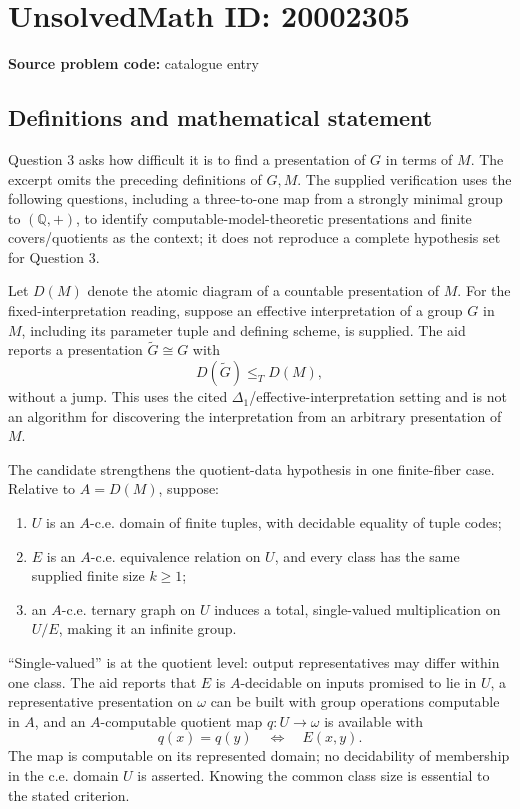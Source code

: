 \documentclass[11pt]{article}
\newcommand{\Q}{\mathbb{Q}}
\begin{document}
\section*{UnsolvedMath ID: 20002305}
\textbf{Source problem code:} catalogue entry
\subsection{Definitions and mathematical statement}
Question 3 asks how difficult it is to find a presentation of \(G\) in terms of \(M\). The excerpt omits the preceding definitions of \(G,M\). The supplied verification uses the following questions, including a three-to-one map from a strongly minimal group to \((\Q,+)\), to identify computable-model-theoretic presentations and finite covers/quotients as the context; it does not reproduce a complete hypothesis set for Question 3.

Let \(D(M)\) denote the atomic diagram of a countable presentation of \(M\). For the fixed-interpretation reading, suppose an effective interpretation of a group \(G\) in \(M\), including its parameter tuple and defining scheme, is supplied. The aid reports a presentation \(\widetilde G\cong G\) with
\[
 D(\widetilde G)\le_T D(M),
\]
without a jump. This uses the cited \(\Delta_1\)/effective-interpretation setting and is not an algorithm for discovering the interpretation from an arbitrary presentation of \(M\).

The candidate strengthens the quotient-data hypothesis in one finite-fiber case. Relative to \(A=D(M)\), suppose:
\begin{enumerate}
\item \(U\) is an \(A\)-c.e. domain of finite tuples, with decidable equality of tuple codes;
\item \(E\) is an \(A\)-c.e. equivalence relation on \(U\), and every class has the same supplied finite size \(k\ge1\);
\item an \(A\)-c.e. ternary graph on \(U\) induces a total, single-valued multiplication on \(U/E\), making it an infinite group.
\end{enumerate}
``Single-valued'' is at the quotient level: output representatives may differ within one class. The aid reports that \(E\) is \(A\)-decidable on inputs promised to lie in \(U\), a representative presentation on \(\omega\) can be built with group operations computable in \(A\), and an \(A\)-computable quotient map \(q:U\to\omega\) is available with
\[
 q(x)=q(y)\quad\Longleftrightarrow\quad E(x,y).
\]
The map is computable on its represented domain; no decidability of membership in the c.e. domain \(U\) is asserted. Knowing the common class size is essential to the stated criterion.
\end{document}
